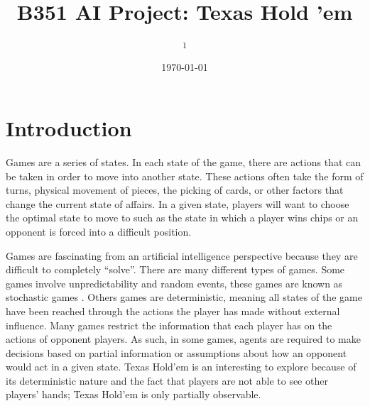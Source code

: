 \documentclass[10pt, a4paper, twocolumn]{article} %
\title{B351 AI Project: Texas Hold 'em} %
\author{
	\authorstyle{Adam Hurm\textsuperscript{1} and Ari Korin\textsuperscript{1}} %
	\newline\newline %
	\textsuperscript{1}\institution{Indiana University, Bloomington, IN, USA} %
}
\date{\today} %
\begin{document}
\maketitle %

\thispagestyle{firstpage} %




\section{Introduction}

Games are a series of states. In each state of the game, there are actions that can be taken in order to move into another state. These actions often take the form of turns, physical movement of pieces, the picking of cards, or other factors that change the current state of affairs. In a given state, players will want to choose the optimal state to move to such as the state in which a player wins chips or an opponent is forced into a difficult position. 
	
	Games are fascinating from an artificial intelligence perspective because they are difficult to completely “solve”. There are many different types of games. Some games involve unpredictability and random events, these games are known as stochastic games \citep{Reference1}. Others games are deterministic, meaning all states of the game have been reached through the actions the player has made without external influence. Many games restrict the information that each player has on the actions of opponent players. As such, in some games, agents are required to make decisions based on partial information or assumptions about how an opponent would act in a given state. Texas Hold’em is an interesting to explore because of its deterministic nature and the fact that players are not able to see other players’ hands; Texas Hold’em is only partially observable. 
\end{document}
